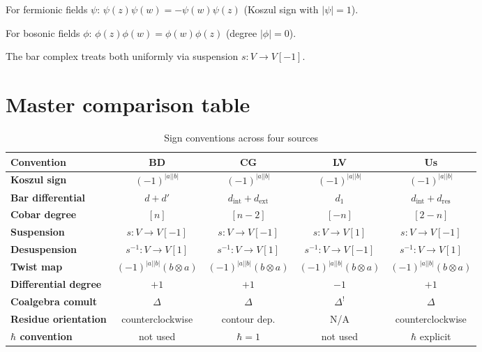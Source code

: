 \begin{remark}\label{rem:fermionic-bosonic-signs-dict}
For fermionic fields $\psi$: $\psi(z)\psi(w) = -\psi(w)\psi(z)$ (Koszul sign with $|\psi| = 1$).

For bosonic fields $\phi$: $\phi(z)\phi(w) = \phi(w)\phi(z)$ (degree $|\phi| = 0$).

The bar complex treats both uniformly via suspension $s: V \to V[-1]$.
\end{remark}


\section{Master comparison table}
\label{sec:master-comparison-signs}

\begin{table}[H]
\centering
\caption{Sign conventions across four sources}
\renewcommand{\arraystretch}{1.6}
\footnotesize
\begin{tabular}{|l|c|c|c|c|}
\hline
\textbf{Convention} & \textbf{BD} & \textbf{CG} & \textbf{LV} & \textbf{Us} \\
\hline
\hline
\textbf{Koszul sign} & $(-1)^{|a||b|}$ & $(-1)^{|a||b|}$ & $(-1)^{|a||b|}$ & $(-1)^{|a||b|}$ \\
\hline
\textbf{Bar differential} & $d + d'$ & $d_{\text{int}} + d_{\text{ext}}$ & $d_1$ & $d_{\text{int}} + d_{\text{res}}$ \\
\hline
\textbf{Cobar degree} & $[n]$ & $[n-2]$ & $[-n]$ & $[2-n]$ \\
\hline
\textbf{Suspension} & $s: V \to V[-1]$ & $s: V \to V[-1]$ & $s: V \to V[1]$ & $s: V \to V[-1]$ \\
\hline
\textbf{Desuspension} & $s^{-1}: V \to V[1]$ & $s^{-1}: V \to V[1]$ & $s^{-1}: V \to V[-1]$ & $s^{-1}: V \to V[1]$ \\
\hline
\textbf{Twist map} & $(-1)^{|a||b|}(b \otimes a)$ & $(-1)^{|a||b|}(b \otimes a)$ & $(-1)^{|a||b|}(b \otimes a)$ & $(-1)^{|a||b|}(b \otimes a)$ \\
\hline
\textbf{Differential degree} & $+1$ & $+1$ & $-1$ & $+1$ \\
\hline
\textbf{Coalgebra comult} & $\Delta$ & $\Delta$ & $\Delta^!$ & $\Delta$ \\
\hline
\textbf{Residue orientation} & counterclockwise & contour dep. & N/A & counterclockwise \\
\hline
\textbf{$\hbar$ convention} & not used & $\hbar = 1$ & not used & $\hbar$ explicit \\
\hline
\end{tabular}
\end{table}

